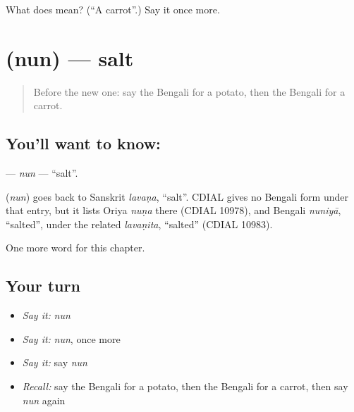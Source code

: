 \begin{tcolorbox}[breakable,colback=teal!4,colframe=teal!35!black,title={Before you move on}]
What does  mean? (\textquotedblleft{}A carrot\textquotedblright{}.) Say it once more.
\end{tcolorbox}
\section[\texorpdfstring{\bn{নুন} (nun)}{নুন (nun)}]{ (nun) — salt}

\label{lesson:BN-C57-nun}



\begin{quote}
Before the new one: say the Bengali for a potato, then the Bengali for a carrot.
\end{quote}

\subsection*{You'll want to know: }
\textbf{} — \emph{nun} — \textquotedblleft{}salt\textquotedblright{}.

\begin{cousinweb}
\textbf{} (\emph{nun}) goes back to Sanskrit \emph{lavaṇa}, \textquotedblleft{}salt\textquotedblright{}. CDIAL gives no Bengali form under that entry, but it lists Oriya \emph{nuṇa} there (CDIAL 10978), and Bengali \emph{nuniyā}, \textquotedblleft{}salted\textquotedblright{}, under the related \emph{lavaṇita}, \textquotedblleft{}salted\textquotedblright{} (CDIAL 10983).
\end{cousinweb}

\begin{grammarlens}[title={What you've built}]
One more word for this chapter.
\end{grammarlens}

\subsection*{Your turn}
\begin{itemize}
\raggedright
  \item \emph{Say it:} \emph{nun}
  \item \emph{Say it:} \emph{nun}, once more
  \item \emph{Say it:} say \emph{nun}
  \item \emph{Recall:} say the Bengali for a potato, then the Bengali for a carrot, then say \emph{nun} again
\end{itemize}


